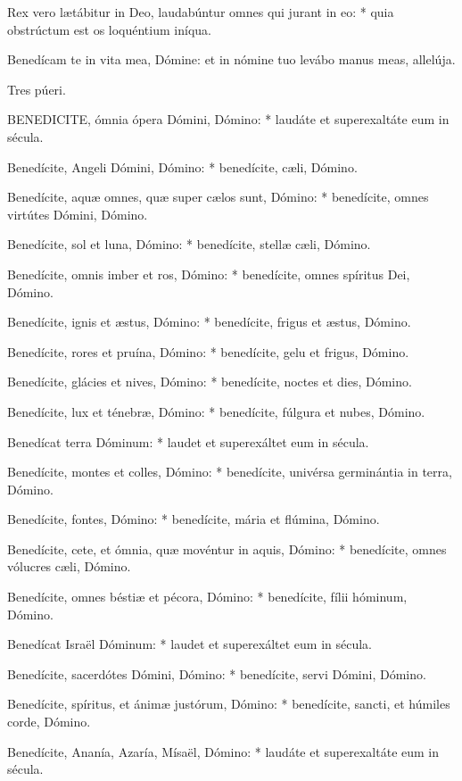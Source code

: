 Rex vero lætábitur in Deo, laudabúntur omnes qui jurant in eo: * quia obstrúctum est os loquéntium iníqua.

 Benedícam te in vita mea, Dómine: et in nómine tuo levábo manus meas, allelúja.

 Tres púeri.


\lettrine[lines=2]{B}{ENEDICITE}, ómnia ópera Dómini, Dómino: * laudáte et superexaltáte eum in sécula.

Benedícite, Angeli Dómini, Dómino: * benedícite, cæli, Dómino.

Benedícite, aquæ omnes, quæ super cælos sunt, Dómino: * benedícite, omnes virtútes Dómini, Dómino.

Benedícite, sol et luna, Dómino: * benedícite, stellæ cæli, Dómino.

Benedícite, omnis imber et ros, Dómino: * benedícite, omnes spíritus Dei, Dómino.

Benedícite, ignis et æstus, Dómino: * benedícite, frigus et æstus, Dómino.

Benedícite, rores et pruína, Dómino: * benedícite, gelu et frigus, Dómino.

Benedícite, glácies et nives, Dómino: * benedícite, noctes et dies, Dómino.

Benedícite, lux et ténebræ, Dómino: * benedícite, fúlgura et nubes, Dómino.

Benedícat terra Dóminum: * laudet et superexáltet eum in sécula.

Benedícite, montes et colles, Dómino: * benedícite, univérsa germinántia in terra, Dómino.

Benedícite, fontes, Dómino: * benedícite, mária et flúmina, Dómino.

Benedícite, cete, et ómnia, quæ movéntur in aquis, Dómino: * benedícite, omnes vólucres cæli, Dómino.

Benedícite, omnes béstiæ et pécora, Dómino: * benedícite, fílii hóminum, Dómino.

Benedícat Israël Dóminum: * laudet et superexáltet eum in sécula.

Benedícite, sacerdótes Dómini, Dómino: * benedícite, servi Dómini, Dómino.

Benedícite, spíritus, et ánimæ justórum, Dómino: * benedícite, sancti, et húmiles corde, Dómino.

Benedícite, Ananía, Azaría, Mísaël, Dómino: * laudáte et superexaltáte eum in sécula.

